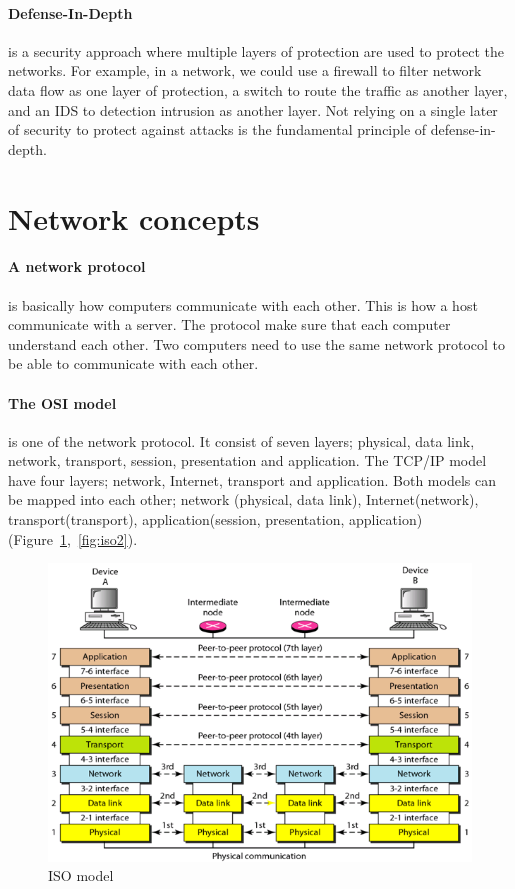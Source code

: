 \documentclass[7x9]{times}
\begin{document}
\paragraph{Defense-In-Depth} is a security approach where
multiple layers of protection are used to protect the
networks. For example, in a network, we could use a firewall
to filter network data flow as one layer of protection, a
switch to route the traffic as another layer, and an IDS to
detection intrusion as another layer. Not relying on a
single later of security to protect against attacks is the
fundamental principle of defense-in-depth.
 


\section{Network concepts}

\paragraph{A network protocol} is basically how computers 
communicate with each other. This is how a host 
communicate with a server. The protocol make sure that each 
computer understand each other. Two computers need to use 
the same network protocol to be able to communicate with 
each other.

\paragraph{The OSI model} is one of the network protocol.
It consist of seven layers; physical, data link, network,
transport, session, presentation and application. The TCP/IP
model have four layers; network, Internet, transport and
application. Both models can be mapped into each other;
network (physical, data link), Internet(network), 
transport(transport), application(session, presentation, 
application)(Figure~\ref{fig:iso1},~\ref{fig:iso2}). 

\begin{figure}
    \includegraphics[]{GOySTAD}
    \caption{ISO model}
    \label{fig:iso1}
\end{figure}
\end{document}
